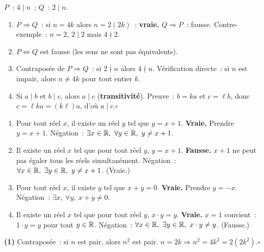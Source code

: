 $P$~: $4\mid n$~; $Q$~: $2\mid n$.

\begin{enumerate}
  \item $P\Rightarrow Q$~: si $n=4k$ alors $n=2(2k)$~: \textbf{vraie.}
        $Q\Rightarrow P$~: fausse. Contre-exemple~: $n=2$, $2\mid2$ mais $4\nmid2$.
  \item $P\Leftrightarrow Q$ est fausse (les sens ne sont pas \'equivalents).
  \item Contrapos\'ee de $P\Rightarrow Q$~: si $2\nmid n$ alors $4\nmid n$.
        V\'erification directe~: si $n$ est impair, alors $n\ne4k$ pour tout entier $k$.
  \item Si $a\mid b$ et $b\mid c$, alors $a\mid c$ (\textbf{transitivit\'e}).
        Preuve~: $b=ka$ et $c=\ell b$, donc $c=\ell ka=(k\ell)a$, d'o\`u $a\mid c$.\hfill$\square$
\end{enumerate}


\begin{enumerate}
  \item \og Pour tout r\'eel $x$, il existe un r\'eel $y$ tel que $y=x+1$.\fg\enspace
        \textbf{Vraie.} Prendre $y=x+1$.
        N\'egation~: $\exists x\in\R,\ \forall y\in\R,\ y\ne x+1$.
  \item \og Il existe un r\'eel $x$ tel que pour tout r\'eel $y$, $y=x+1$.\fg\enspace
        \textbf{Fausse.} $x+1$ ne peut pas \'egaler tous les r\'eels simultanément.
        N\'egation~: $\forall x\in\mathbb{R},\ \exists y\in\mathbb{R},\ y\ne x+1$. (Vraie.)
  \item \og Pour tout r\'eel $x$, il existe $y$ tel que $x+y=0$.\fg\enspace
        \textbf{Vraie.} Prendre $y=-x$.
        N\'egation~: $\exists x,\ \forall y,\ x+y\ne0$.
  \item \og Il existe un r\'eel $x$ tel que pour tout r\'eel $y$, $x\cdot y=y$.\fg\enspace
        \textbf{Vraie.} $x=1$ convient~: $1\cdot y=y$ pour tout $y\in\mathbb{R}$.
        N\'egation~: $\forall x\in\mathbb{R},\ \exists y\in\mathbb{R},\ x\cdot y\ne y$. (Fausse.)
\end{enumerate}


\textbf{(1)} Contrapos\'ee~: si $n$ est pair, alors $n^2$ est pair.
$n=2k\Rightarrow n^2=4k^2=2(2k^2)$.\hfill$\square$

